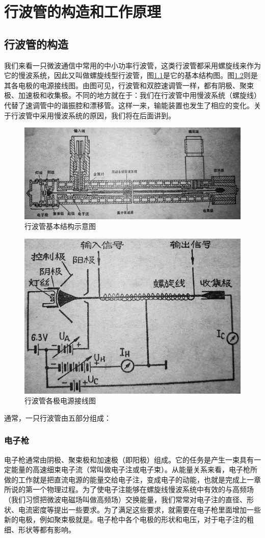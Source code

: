 \chapter{行波管的构造和工作原理} \label{ch2}
\section{行波管的构造}
我们来看一只微波通信中常用的中小功率行波管，这类行波管都采用螺旋线来作为它的慢波系统，因此又叫做螺旋线型行波管，图\ref{ch2-1}是它的基本结构图。图\ref{ch2-2}则是其各电极的电源接线图。由图可见，行波管和双腔速调管一样，都有阴极、聚束极、加速极和收集极。不同的地方就在于：我们在行波管中用慢波系统（螺旋线）代替了速调管中的谐振腔和漂移管。这样一来，输能装置也发生了相应的变化。关于行波管中采用慢波系统的原因，我们将在后面讲到。

\begin{figure}[phtb]
	\centering
	\includegraphics[width=0.95\linewidth]{figure/ch2-1}
	\caption{行波管基本结构示意图}
	\label{ch2-1}
\end{figure}

\begin{figure}[phtb]
	\centering
	\includegraphics[width=0.65\linewidth]{figure/ch2-2}
	\caption{行波管各极电源接线图}
	\label{ch2-2}
\end{figure}

通常，一只行波管由五部分组成：
\subsection{电子枪}
电子枪通常由阴极、聚束极和加速极（即阳极）组成。它的任务是产生一束具有一定能量的高速细束电子流（常叫做电子注或电子束）。从能量关系来看，电子枪所做的工作就是把直流电源的能量交给电子注，变成电子的动能，也就是完成上一章所说的第一个物理过程。为了使电子注能够在螺旋线慢波系统中有效的与高频场（我们习惯把微波电磁场叫做高频场）交换能量，我们常常对电子注的直径、形状、电流密度等提出一些要求。为了满足这些要求，就需要在电子枪里面增加一些新的电极，例如聚束极就是。电子枪中各个电极的形状和电压，对于电子注的粗细、形状等都有影响。

